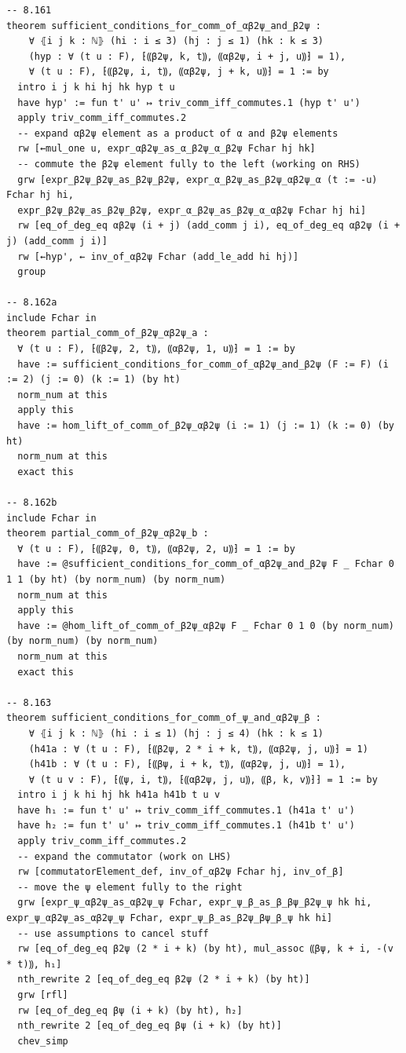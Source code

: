\begin{Verbatim}
-- 8.161
theorem sufficient_conditions_for_comm_of_αβ2ψ_and_β2ψ :
    ∀ ⦃i j k : ℕ⦄ (hi : i ≤ 3) (hj : j ≤ 1) (hk : k ≤ 3)
    (hyp : ∀ (t u : F), ⁅⸨β2ψ, k, t⸩, ⸨αβ2ψ, i + j, u⸩⁆ = 1),
    ∀ (t u : F), ⁅⸨β2ψ, i, t⸩, ⸨αβ2ψ, j + k, u⸩⁆ = 1 := by
  intro i j k hi hj hk hyp t u
  have hyp' := fun t' u' ↦ triv_comm_iff_commutes.1 (hyp t' u')
  apply triv_comm_iff_commutes.2
  -- expand αβ2ψ element as a product of α and β2ψ elements
  rw [←mul_one u, expr_αβ2ψ_as_α_β2ψ_α_β2ψ Fchar hj hk]
  -- commute the β2ψ element fully to the left (working on RHS)
  grw [expr_β2ψ_β2ψ_as_β2ψ_β2ψ, expr_α_β2ψ_as_β2ψ_αβ2ψ_α (t := -u) Fchar hj hi,
  expr_β2ψ_β2ψ_as_β2ψ_β2ψ, expr_α_β2ψ_as_β2ψ_α_αβ2ψ Fchar hj hi]
  rw [eq_of_deg_eq αβ2ψ (i + j) (add_comm j i), eq_of_deg_eq αβ2ψ (i + j) (add_comm j i)]
  rw [←hyp', ← inv_of_αβ2ψ Fchar (add_le_add hi hj)]
  group

-- 8.162a
include Fchar in
theorem partial_comm_of_β2ψ_αβ2ψ_a :
  ∀ (t u : F), ⁅⸨β2ψ, 2, t⸩, ⸨αβ2ψ, 1, u⸩⁆ = 1 := by
  have := sufficient_conditions_for_comm_of_αβ2ψ_and_β2ψ (F := F) (i := 2) (j := 0) (k := 1) (by ht)
  norm_num at this
  apply this
  have := hom_lift_of_comm_of_β2ψ_αβ2ψ (i := 1) (j := 1) (k := 0) (by ht)
  norm_num at this
  exact this

-- 8.162b
include Fchar in
theorem partial_comm_of_β2ψ_αβ2ψ_b :
  ∀ (t u : F), ⁅⸨β2ψ, 0, t⸩, ⸨αβ2ψ, 2, u⸩⁆ = 1 := by
  have := @sufficient_conditions_for_comm_of_αβ2ψ_and_β2ψ F _ Fchar 0 1 1 (by ht) (by norm_num) (by norm_num)
  norm_num at this
  apply this
  have := @hom_lift_of_comm_of_β2ψ_αβ2ψ F _ Fchar 0 1 0 (by norm_num) (by norm_num) (by norm_num)
  norm_num at this
  exact this

-- 8.163
theorem sufficient_conditions_for_comm_of_ψ_and_αβ2ψ_β :
    ∀ ⦃i j k : ℕ⦄ (hi : i ≤ 1) (hj : j ≤ 4) (hk : k ≤ 1)
    (h41a : ∀ (t u : F), ⁅⸨β2ψ, 2 * i + k, t⸩, ⸨αβ2ψ, j, u⸩⁆ = 1)
    (h41b : ∀ (t u : F), ⁅⸨βψ, i + k, t⸩, ⸨αβ2ψ, j, u⸩⁆ = 1),
    ∀ (t u v : F), ⁅⸨ψ, i, t⸩, ⁅⸨αβ2ψ, j, u⸩, ⸨β, k, v⸩⁆⁆ = 1 := by
  intro i j k hi hj hk h41a h41b t u v
  have h₁ := fun t' u' ↦ triv_comm_iff_commutes.1 (h41a t' u')
  have h₂ := fun t' u' ↦ triv_comm_iff_commutes.1 (h41b t' u')
  apply triv_comm_iff_commutes.2
  -- expand the commutator (work on LHS)
  rw [commutatorElement_def, inv_of_αβ2ψ Fchar hj, inv_of_β]
  -- move the ψ element fully to the right
  grw [expr_ψ_αβ2ψ_as_αβ2ψ_ψ Fchar, expr_ψ_β_as_β_βψ_β2ψ_ψ hk hi, expr_ψ_αβ2ψ_as_αβ2ψ_ψ Fchar, expr_ψ_β_as_β2ψ_βψ_β_ψ hk hi]
  -- use assumptions to cancel stuff
  rw [eq_of_deg_eq β2ψ (2 * i + k) (by ht), mul_assoc ⸨βψ, k + i, -(v * t)⸩, h₁]
  nth_rewrite 2 [eq_of_deg_eq β2ψ (2 * i + k) (by ht)]
  grw [rfl]
  rw [eq_of_deg_eq βψ (i + k) (by ht), h₂]
  nth_rewrite 2 [eq_of_deg_eq βψ (i + k) (by ht)]
  chev_simp


\end{Verbatim}
